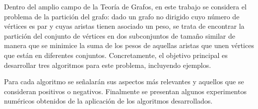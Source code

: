 Dentro del amplio campo de la Teoría de Grafos, en este trabajo se considera el problema de la partición del grafo: dado un grafo no dirigido cuyo número de vértices es par y cuyas aristas tienen asociado un peso, se trata de encontrar la partición del conjunto de vértices en dos subconjuntos de tamaño similar de manera que se minimice la suma de los pesos de aquellas aristas que unen vértices que están en diferentes conjuntos. Concretamente, el objetivo principal es desarrollar tres algoritmos para este problema, incluyendo ejemplos. 

Para cada algoritmo se señalarán sus aspectos más relevantes y aquellos que se consideran positivos o negativos. Finalmente se presentan algunos experimentos numéricos obtenidos de la aplicación de los algoritmos desarrollados.
